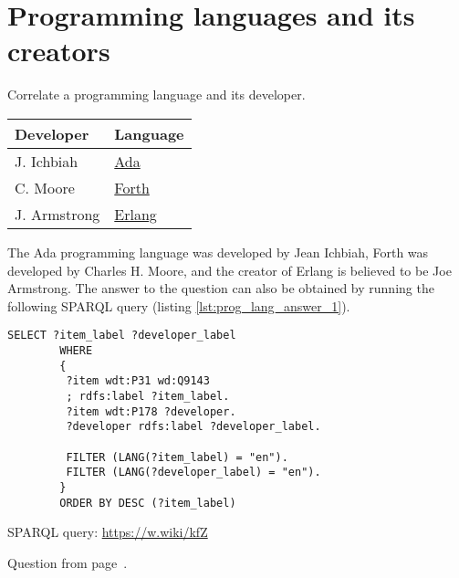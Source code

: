 \section{Programming languages and its creators}
\begin{exercise}
    \label{answer:prog_lang_1}
Correlate a programming language and its developer.
	\begin{tabular}{ll}
		Developer & Language\\
		\hline
		J. Ichbiah & \href{https://www.wikidata.org/wiki/Q154755}{Ada}\\
		C. Moore & \href{https://www.wikidata.org/wiki/Q275472}{Forth}\\
		J. Armstrong & \href{https://www.wikidata.org/wiki/Q334879}{Erlang}\\
	\end{tabular}
\end{exercise}
    The Ada programming language was developed by Jean Ichbiah, Forth was developed by Charles H. Moore, and the creator of Erlang is believed to be Joe Armstrong. The answer to the question can also be obtained by running the following SPARQL query (listing \ref{lst:prog_lang_answer_1}). 
	\begin{lstlisting}[language=SPARQL, caption={{Programming languages developers}\protect\footnotemark}, label=lst:prog_lang_answer_1]
		SELECT ?item_label ?developer_label
		WHERE
		{
		 ?item wdt:P31 wd:Q9143
		 ; rdfs:label ?item_label. 
		 ?item wdt:P178 ?developer.
		 ?developer rdfs:label ?developer_label.
		 
		 FILTER (LANG(?item_label) = "en"). 
		 FILTER (LANG(?developer_label) = "en"). 
		}
		ORDER BY DESC (?item_label)
	\end{lstlisting}
SPARQL query: \href{https://w.wiki/kfZ}{https://w.wiki/kfZ}

Question from page~\pageref{question:prog_lang_1}.


